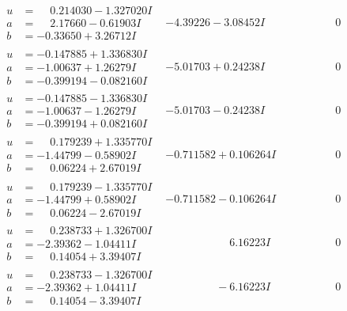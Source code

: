 \documentclass[1p]{elsarticle_modified}
\theoremstyle{definition}
\begin{document}
$$\begin{array}{c|c|c}
\begin{aligned}
u &= \phantom{-}0.214030 - 1.327020 I \\
a &= \phantom{-}2.17660 - 0.61903 I \\
b &= -0.33650 + 3.26712 I\end{aligned}
 & -4.39226 - 3.08452 I & \phantom{-0.000000 } 0 \\ \hline\begin{aligned}
u &= -0.147885 + 1.336830 I \\
a &= -1.00637 + 1.26279 I \\
b &= -0.399194 - 0.082160 I\end{aligned}
 & -5.01703 + 0.24238 I & \phantom{-0.000000 } 0 \\ \hline\begin{aligned}
u &= -0.147885 - 1.336830 I \\
a &= -1.00637 - 1.26279 I \\
b &= -0.399194 + 0.082160 I\end{aligned}
 & -5.01703 - 0.24238 I & \phantom{-0.000000 } 0 \\ \hline\begin{aligned}
u &= \phantom{-}0.179239 + 1.335770 I \\
a &= -1.44799 - 0.58902 I \\
b &= \phantom{-}0.06224 + 2.67019 I\end{aligned}
 & -0.711582 + 0.106264 I & \phantom{-0.000000 } 0 \\ \hline\begin{aligned}
u &= \phantom{-}0.179239 - 1.335770 I \\
a &= -1.44799 + 0.58902 I \\
b &= \phantom{-}0.06224 - 2.67019 I\end{aligned}
 & -0.711582 - 0.106264 I & \phantom{-0.000000 } 0 \\ \hline\begin{aligned}
u &= \phantom{-}0.238733 + 1.326700 I \\
a &= -2.39362 - 1.04411 I \\
b &= \phantom{-}0.14054 + 3.39407 I\end{aligned}
 & \phantom{-0.000000 -}6.16223 I & \phantom{-0.000000 } 0 \\ \hline\begin{aligned}
u &= \phantom{-}0.238733 - 1.326700 I \\
a &= -2.39362 + 1.04411 I \\
b &= \phantom{-}0.14054 - 3.39407 I\end{aligned}
 & \phantom{-0.000000 } -6.16223 I & \phantom{-0.000000 } 0\\

\end{array}$$
\end{document}
